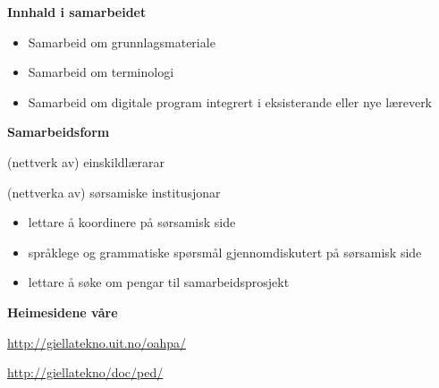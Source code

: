 \documentclass[landscape,norsk,11pt]{seminar}
\begin{document}
\begin{slide}
\newslide

\textbf{Innhald i samarbeidet}
\begin{itemize}
\item{Samarbeid om grunnlagsmateriale}
\item{Samarbeid om terminologi}
\item{Samarbeid om digitale program integrert i eksisterande eller nye læreverk}
\end{itemize}

\newslide

\textbf{Samarbeidsform}

(nettverk av) einskildlærarar

(nettverka av) sørsamiske institusjonar

\begin{itemize}
\item{lettare å koordinere på sørsamisk side}
\item{språklege og grammatiske spørsmål gjennomdiskutert på sørsamisk side}
\item{lettare å søke om pengar til samarbeidsprosjekt}
\end{itemize}



\newslide
\textbf{Heimesidene våre}

\url{http://giellatekno.uit.no/oahpa/}

\url{http://giellatekno/doc/ped/}


\end{slide}
\end{document}
